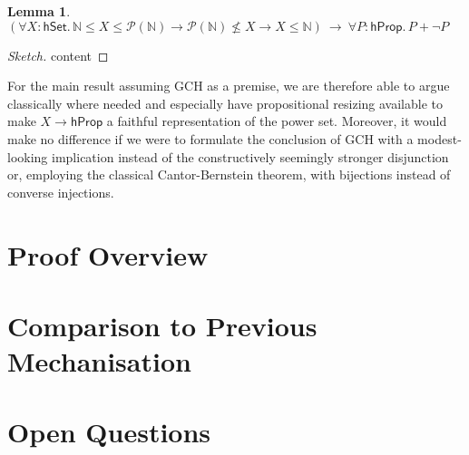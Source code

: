 \documentclass{easychair}
\newcommand{\nat}{\mathbb{N}}
\newcommand{\pow}{\mathcal{P}}
\newcommand{\hprop}{\mathsf{hProp}}
\newcommand{\hset}{\mathsf{hSet}}
\newtheorem{lemma}{Lemma}
\begin{document}
\begin{lemma}
	$(\forall X:\hset.\,\nat \le X\le \pow(\nat)\to \pow(\nat)\not\le X\to X\le \nat)~\to~\forall P:\hprop.\,P+\neg P$
\end{lemma}
\begin{proof}[Sketch]
	content
\end{proof}

For the main result assuming GCH as a premise, we are therefore able to argue classically where needed and especially have propositional resizing available to make $X\to\hprop$ a faithful representation of the power set.
Moreover, it would make no difference if we were to formulate the conclusion of GCH with a modest-looking implication instead of the constructively seemingly stronger disjunction or, employing the classical Cantor-Bernstein theorem, with bijections instead of converse injections.


\section{Proof Overview}

\section{Comparison to Previous Mechanisation}

\section{Open Questions}



\scriptsize{}
\vspace{-20em}
\end{document}

